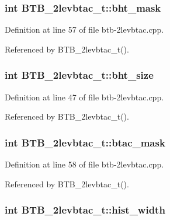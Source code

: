 \subsubsection[{bht\_\-mask}]{\setlength{\rightskip}{0pt plus 5cm}int {\bf BTB\_\-2levbtac\_\-t::bht\_\-mask}\hspace{0.3cm}{\tt  [protected]}}\label{classBTB__2levbtac__t_daaef5d4082038f3c40b6cd212cb7d3d}




Definition at line 57 of file btb-2levbtac.cpp.

Referenced by BTB\_\-2levbtac\_\-t().
\subsubsection[{bht\_\-size}]{\setlength{\rightskip}{0pt plus 5cm}int {\bf BTB\_\-2levbtac\_\-t::bht\_\-size}\hspace{0.3cm}{\tt  [protected]}}\label{classBTB__2levbtac__t_50ae5ed21b27ecdb87912e1a3adcc911}




Definition at line 47 of file btb-2levbtac.cpp.

Referenced by BTB\_\-2levbtac\_\-t().
\subsubsection[{btac\_\-mask}]{\setlength{\rightskip}{0pt plus 5cm}int {\bf BTB\_\-2levbtac\_\-t::btac\_\-mask}\hspace{0.3cm}{\tt  [protected]}}\label{classBTB__2levbtac__t_795c92f669b0671db88d666304b0cf1c}




Definition at line 58 of file btb-2levbtac.cpp.

Referenced by BTB\_\-2levbtac\_\-t().
\subsubsection[{hist\_\-width}]{\setlength{\rightskip}{0pt plus 5cm}int {\bf BTB\_\-2levbtac\_\-t::hist\_\-width}\hspace{0.3cm}{\tt  [protected]}}\label{classBTB__2levbtac__t_27f4c02daffbdf13ffe9e3e88bac997c}




